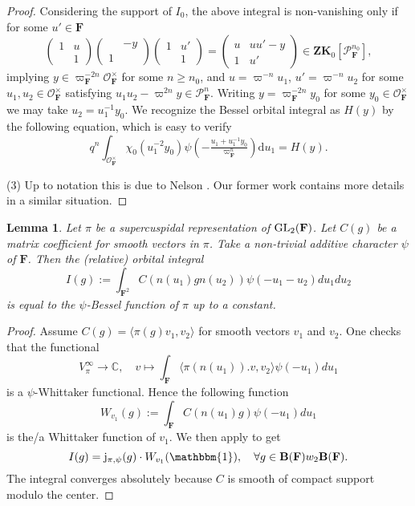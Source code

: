 \documentclass[A4]{amsart}
\def\geq{\geqslant}
\newtheorem{lemma}      [theorem]{Lemma}
\numberwithin{equation}{section} \everymath{\displaystyle}
\newcommand{\gp}[1]{\mathbf{#1}}
\newcommand{\GL}{{\rm GL}}
\newcommand{\id}{\mathbbm{1}}
\newcommand{\ud}{\mathrm{d}}
\newcommand{\C}{\mathbb{C}}
\newcommand{\F}{\mathbf{F}}
\newcommand{\vO}{\mathcal{O}}
\newcommand{\vP}{\mathcal{P}}
\newcommand{\Pairing}[2]{\langle #1, #2 \rangle}
\newcommand{\BesselF}{\mathrm{j}}
\begin{document}
\begin{proof}
	Considering the support of $I_0$, the above integral is non-vanishing only if for some $u' \in \F$
	$$ \begin{pmatrix} 1 & u \\ & 1 \end{pmatrix} \begin{pmatrix} & -y \\ 1 & \end{pmatrix} \begin{pmatrix} 1 & u' \\ & 1 \end{pmatrix} = \begin{pmatrix} u & uu'-y \\ 1 & u' \end{pmatrix} \in \gp{Z} \gp{K}_0[\vP_{\F}^{n_0}], $$
	implying $y \in \varpi_{\F}^{-2n} \vO_{\F}^{\times}$ for some $n \geq n_0$, and $u=\varpi^{-n}u_1$, $u' = \varpi^{-n}u_2$ for some $u_1,u_2 \in \vO_{\F}^{\times}$ satisfying $u_1u_2-\varpi^{2n}y \in \vP_{\F}^n$. Writing $y = \varpi_{\F}^{-2n}y_0$ for some $y_0 \in \vO_{\F}^{\times}$ we may take $u_2 = u_1^{-1} y_0$. We recognize the Bessel orbital integral as $H(y)$ by the following equation, which is easy to verify
	$$ q^n \int_{\vO_{\F}^{\times}} \chi_0(u_1^{-2} y_0) \psi \left( - \tfrac{u_1 + u_1^{-1}y_0}{\varpi_{\F}^n} \right) \ud u_1 = H(y). $$
	
\noindent (3) Up to notation this is due to Nelson \cite[Theorem 3.1]{Ne20}. Our former work \cite[Lemma 4.1]{BFW21+} contains more details in a similar situation.
\end{proof}

\begin{lemma} \label{lem: MCSuperCuspBessel}
	Let $\pi$ be a supercuspidal representation of $\GL_2(\F)$. Let $C(g)$ be a matrix coefficient for smooth vectors in $\pi$. Take a non-trivial additive character $\psi$ of $\F$. Then the (relative) orbital integral
	$$ I(g) := \int_{\F^2} C(n(u_1)gn(u_2)) \psi(-u_1-u_2) du_1 du_2 $$
	is equal to the $\psi$-Bessel function of $\pi$ up to a constant.
\end{lemma}
\begin{proof}
	Assume $C(g) = \Pairing{\pi(g)v_1}{v_2}$ for smooth vectors $v_1$ and $v_2$. One checks that the functional
	$$ V_{\pi}^{\infty} \to \C, \quad v \mapsto \int_{\F} \Pairing{\pi(n(u_1)).v}{v_2} \psi(-u_1) du_1 $$
	is a $\psi$-Whittaker functional. Hence the following function
	$$ W_{v_1}(g) := \int_{\F} C(n(u_1)g) \psi(-u_1) du_1 $$
	is the/a Whittaker function of $v_1$. We then apply \cite[Lemma 4.1]{So84} to get
	$$ I(g) = \BesselF_{\pi,\psi}(g) \cdot W_{v_1}(\id), \quad \forall g \in \gp{B}(\F)w_2\gp{B}(\F). $$
	The integral converges absolutely because $C$ is smooth of compact support modulo the center.
\end{proof}
\end{document}
